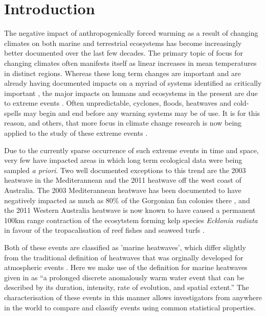\documentclass[a4paper,10pt,review]{elsarticle}
\begin{document}
\linenumbers

\section{Introduction}
The negative impact of anthropogenically forced warming as a result of changing climates on both marine and terrestrial ecosystems has become increasingly better documented over the last few decades. The primary topic of focus for changing climates often manifests itself as linear increases in mean temperatures in distinct regions. Whereas these long term changes are important and are already having documented impacts on a myriad of systems identified as critically important \citep{IPCC2014}, the major impacts on humans and ecosystems in the present are due to extreme events \citep{Easterling2000}. Often unpredictable, cyclones, floods, heatwaves and cold-spells may begin and end before any warning systems may be of use. It is for this reason, and others, that more focus in climate change research is now being applied to the study of these extreme events \citep{Jentsch2007}.

Due to the currently sparse occurrence of such extreme events in time and space, very few have impacted areas in which long term ecological data were being sampled \emph{a priori}. Two well documented exceptions to this trend are the 2003 heatwave in the Mediterannean and the 2011 heatwave off the west coast of Australia. The 2003 Mediterannean heatwave has been documented to have negatively impacted as much as 80\% of the Gorgonian fan colonies there \citep{Garrabou2009}, and the 2011 Western Australia heatwave is now known to have caused a permanent 100km range contraction of the ecosytstem forming kelp species \emph{Ecklonia radiata} in favour of the tropacalisation of reef fishes and seaweed turfs \citep{Wernberg2016}.

Both of these events are classified as 'marine heatwaves', which differ slightly from the traditional definition of heatwaves that was orginally developed for atmospheric events \citep{Perkins2013}. Here we make use of the definition for marine heatwaves given in \citet{Hobday2016} as ``a prolonged discrete anomalously warm water event that can be described by its duration, intensity, rate of evolution, and spatial extent.'' The characterisation of these events in this manner allows investigators from anywhere in the world to compare and classify events using common statistical properties.
\end{document}
